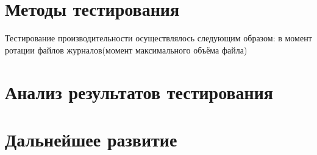 \section{Методы тестирования}
Тестирование производительности осуществлялось следующим образом:
в момент ротации файлов журналов(момент максимального объёма файла)
\newpage
\section{Анализ результатов тестирования}
\newpage

\section{Дальнейшее развитие}
